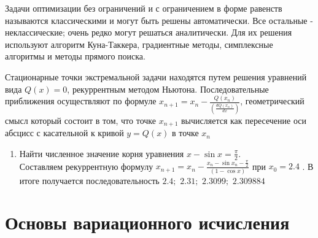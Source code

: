 \documentclass[preprint,russian,a5paper,10pt,twoside,mediummath]{ncc}
\begin{document}
%
\par Задачи оптимизации без ограничений и с ограничением в форме равенств называются классическими и могут быть решены автоматически. Все остальные - неклассические; очень редко могут решаться аналитически. Для их решения используют алгоритм Куна-Таккера, градиентные методы, симплексные алгоритмы и методы прямого поиска.
\par Стационарные точки экстремальной задачи находятся путем решения уравнений вида $Q\left( x \right)=0$, рекуррентным методом Ньютона. Последовательные приближения осуществляют по формуле ${{x}_{n+1}}={{x}_{n}}-\frac{Q\left( {{x}_{n}} \right)}{\left( \frac{dQ\left( {{x}_{n}} \right)}{dx} \right)}$, геометрический смысл который состоит в том, что точке ${{x}_{n+1}}$ вычисляется как пересечение оси абсцисс с касательной к кривой $y=Q\left( x \right)$ в точке ${{x}_{n}}$ 
\begin{enumerate}[resume]
\item Найти численное значение корня уравнения $x-\sin x=\frac{\pi }{2}$.
\\Составляем рекуррентную формулу ${{x}_{n+1}}={{x}_{n}}-\frac{{{x}_{n}}-\sin {{x}_{n}}-\frac{\pi }{2}}{\left( 1-\cos x \right)}$ при ${{x}_{0}}=2.4$ . В итоге получается последовательность $2.4;$ $2.31;$ $2.3099;$ $2.309884$ 
\end{enumerate}


\clearpage
\section{Основы вариационного исчисления\label{variations}}
\end{document}
